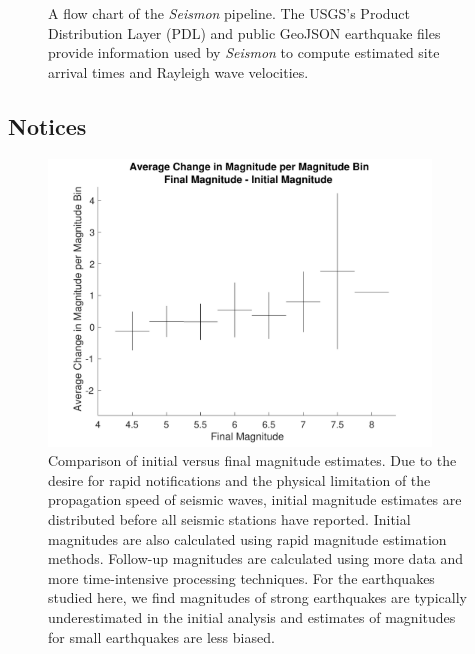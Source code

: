 \documentclass[twocolumn, aps, superscriptaddress]{revtex4}
\begin{document}
\begin{figure}[t]
 \begin{center}
 \end{center}
 \caption{A flow chart of the \emph{Seismon} pipeline. The USGS's Product Distribution Layer (PDL) and public GeoJSON earthquake files provide information used by \emph{Seismon} to compute estimated site arrival times and Rayleigh wave velocities.}
 \label{fig:flowchart}
\end{figure}

\subsection{Notices}

\begin{figure}[t]
\hspace*{-0.5cm}
\centering
\includegraphics[width=4in]{AverageChange.pdf}
\caption{Comparison of initial versus final magnitude estimates. Due to the desire for rapid notifications and the physical limitation of the propagation speed of seismic waves, initial magnitude estimates are distributed before all seismic stations have reported. Initial magnitudes are also calculated using rapid magnitude estimation methods. Follow-up magnitudes are calculated using more data and more time-intensive processing techniques. For the earthquakes studied here, we find magnitudes of strong earthquakes are typically underestimated in the initial analysis and estimates of magnitudes for small earthquakes are less biased.}
 \label{fig:initialfinal}
 \end{figure}
\end{document}
